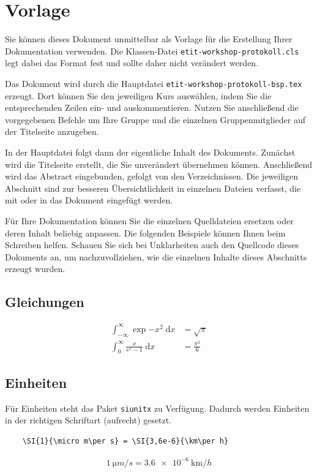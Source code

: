 \section{Vorlage}
Sie können dieses Dokument unmittelbar als Vorlage für die Erstellung Ihrer Dokumentation verwenden. Die Klassen-Datei \verb|etit-workshop-protokoll.cls| legt dabei das Format fest und sollte daher nicht verändert werden.

Das Dokument wird durch die Hauptdatei \verb|etit-workshop-protokoll-bsp.tex| erzeugt. Dort können Sie den jeweiligen Kurs auswählen, indem Sie die entsprechenden Zeilen ein- und auskommentieren. Nutzen Sie anschließend die vorgegebenen Befehle um Ihre Gruppe und die einzelnen Gruppenmitglieder auf der Titelseite anzugeben.

In der Hauptdatei folgt dann der eigentliche Inhalt des Dokuments. Zunächst wird die Titelseite erstellt, die Sie unverändert übernehmen können. Anschließend wird das Abstract eingebunden, gefolgt von den Verzeichnissen. Die jeweiligen Abschnitt sind zur besseren Übersichtlichkeit in einzelnen Dateien verfasst, die mit \verb|| oder \verb|| in das Dokument eingefügt werden. 

Für Ihre Dokumentation können Sie die einzelnen Quelldateien ersetzen oder deren Inhalt beliebig anpassen. Die folgenden Beispiele können Ihnen beim Schreiben helfen. Schauen Sie sich bei Unklarheiten auch den Quellcode dieses Dokuments an, um nachzuvollziehen, wie die einzelnen Inhalte dieses Abschnitts erzeugt wurden.

\subsection{Gleichungen}
\begin{align}
    \int_{-\infty}^{\infty}\exp{-x^2}\;\mathrm{d}x &= \sqrt{\pi}\\
    \int_0^{\infty}\frac{x}{e^x-1}\;\mathrm{d}x&=\frac{\pi^2}{6}
\end{align}


\subsection{Einheiten}
Für Einheiten steht das Paket \verb|siunitx| zu Verfügung. Dadurch werden Einheiten in der richtigen Schriftart (aufrecht) gesetzt.
\begin{verbatim}
    \SI{1}{\micro m\per s} = \SI{3,6e-6}{\km\per h}
\end{verbatim}
\begin{align}
    \SI{1}{\micro m\per s} = \SI{3,6e-6}{\km\per h}
\end{align}


